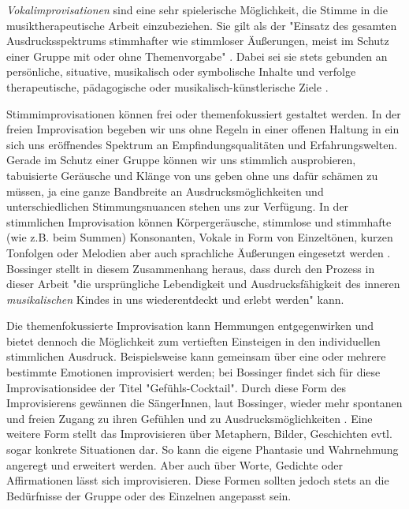 \emph{Vokalimprovisationen} sind eine sehr spielerische Möglichkeit, die Stimme in die musiktherapeutische Arbeit einzubeziehen. Sie gilt als der "Einsatz des gesamten Ausdrucksspektrums stimmhafter wie stimmloser Äußerungen, meist im Schutz einer Gruppe mit oder ohne Themenvorgabe" \autocite [108]{rittner1990}. Dabei sei sie stets gebunden an persönliche, situative, musikalisch oder symbolische Inhalte und verfolge therapeutische, pädagogische oder musikalisch-künstlerische Ziele \autocite[vgl.][109]{rittner1990}. 

Stimmimprovisationen können frei oder themenfokussiert gestaltet werden. In der freien Improvisation begeben wir uns ohne Regeln in einer offenen Haltung in ein sich uns eröffnendes Spektrum an Empfindungsqualitäten und Erfahrungswelten. Gerade im Schutz einer Gruppe können wir uns stimmlich ausprobieren, tabuisierte Geräusche und Klänge von uns geben ohne uns dafür schämen zu müssen, ja eine ganze Bandbreite an Ausdrucksmöglichkeiten und unterschiedlichen Stimmungsnuancen stehen uns zur Verfügung. In der stimmlichen Improvisation können Körpergeräusche, stimmlose und stimmhafte (wie z.B. beim Summen) Konsonanten, Vokale in Form von Einzeltönen, kurzen Tonfolgen oder Melodien aber auch sprachliche Äußerungen eingesetzt werden \autocite[vgl.][109]{rittner1990}. Bossinger stellt in diesem Zusammenhang heraus, dass durch den Prozess in dieser Arbeit "die ursprüngliche Lebendigkeit und Ausdrucksfähigkeit des inneren \emph{musikalischen} Kindes in uns wiederentdeckt und erlebt werden" \autocite[272]{bossinger2006} kann.

Die themenfokussierte Improvisation kann Hemmungen entgegenwirken und bietet dennoch die Möglichkeit zum vertieften Einsteigen in den individuellen stimmlichen Ausdruck. Beispielsweise kann gemeinsam über eine oder mehrere bestimmte Emotionen improvisiert werden; bei Bossinger findet sich für diese Improvisationsidee der Titel "Gefühls-Cocktail". Durch diese Form des Improvisierens gewännen die SängerInnen, laut Bossinger, wieder mehr spontanen und freien Zugang zu ihren Gefühlen und zu Ausdrucksmöglichkeiten \autocite[vgl.][273]{bossinger2006}. Eine weitere Form stellt das Improvisieren über Metaphern, Bilder, Geschichten evtl. sogar konkrete Situationen dar. So kann die eigene Phantasie und Wahrnehmung angeregt und erweitert werden. Aber auch über Worte, Gedichte oder Affirmationen lässt sich improvisieren. Diese Formen sollten jedoch stets an die Bedürfnisse der Gruppe oder des Einzelnen angepasst sein.

